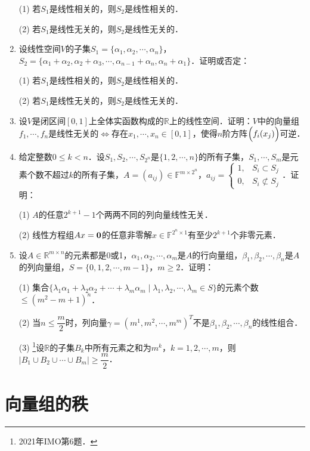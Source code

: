 \documentclass[a4paper,fontset=windows]{ctexbook}
\theoremstyle{definition}
\renewcommand{\le}{\leqslant}
\renewcommand{\ge}{\geqslant}
\begin{document}
\begin{enumerate}
(1) 若$S_1$是线性相关的，则$S_2$是线性相关的．

(2) 若$S_1$是线性无关的，则$S_2$是线性无关的．

\item 设线性空间$V$的子集$S_1=\{\alpha_1,\alpha_2,\cdots,\alpha_n\}$，$S_2=\{\alpha_1+\alpha_2,\alpha_2+\alpha_3,\cdots,\alpha_{n-1}+\alpha_n,\alpha_n+\alpha_1\}$．证明或否定：

(1) 若$S_1$是线性相关的，则$S_2$是线性相关的．

(2) 若$S_1$是线性无关的，则$S_2$是线性无关的．

\item 设$V$是闭区间$[0,1]$上全体实函数构成的$\mathbb{R}$上的线性空间．证明：$V$中的向量组$f_1,\cdots,f_n$是线性无关的$\Leftrightarrow$存在$x_1,\cdots,x_n\in[0,1]$，使得$n$阶方阵$\Bigl(f_i(x_j)\Bigr)$可逆．

\item 给定整数$0\le k<n$．设$S_1,S_2,\cdots,S_{2^n}$是$\{1,2,\cdots,n\}$的所有子集，$S_1,\cdots,S_m$是元素个数不超过$k$的所有子集，$A=(a_{ij})\in\mathbb{F}^{m\times 2^n}$，$a_{ij}=\begin{cases}1,&S_i\subset S_j \\ 0,&S_i\not\subset S_j\end{cases}$．证明：

(1) $A$的任意$2^{k+1}-1$个两两不同的列向量线性无关．

(2) 线性方程组$Ax={\bf 0}$的任意非零解$x\in\mathbb{F}^{2^n\times 1}$有至少$2^{k+1}$个非零元素．

\item 设$A\in\mathbb{R}^{m\times n}$的元素都是0或1，$\alpha_1,\alpha_2,\cdots,\alpha_m$是$A$的行向量组，$\beta_1,\beta_2,\cdots,\beta_n$是$A$的列向量组，$S=\{0,1,2,\cdots,m-1\}$，$m\ge 2$．证明：

(1) 集合$\{\lambda_1\alpha_1+\lambda_2\alpha_2+\cdots+\lambda_m\alpha_m\mid\lambda_1,\lambda_2,\cdots,\lambda_m\in S\}$的元素个数$\le(m^2-m+1)^n$．

(2) 当$n\le\dfrac{m}{2}$时，列向量$\gamma=(m^1,m^2,\cdots,m^m)^T$不是$\beta_1,\beta_2,\cdots,\beta_n$的线性组合．

(3) \footnote{2021年IMO第6题．}设$\mathbb{R}$的子集$B_k$中所有元素之和为$m^k$，$k=1,2,\cdots,m$，则$|B_1\cup B_2\cup\cdots\cup B_m|\ge\dfrac{m}{2}$．

\end{enumerate}

\clearpage\section{向量组的秩}
\end{document}

